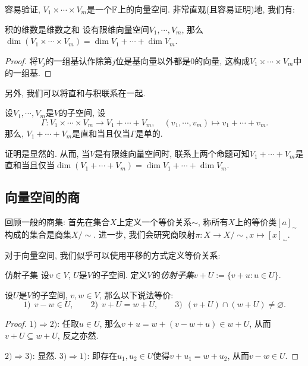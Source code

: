 容易验证, $V_1 \times \cdots \times V_m$是一个$\mathbb{F}$上的向量空间. 非常直观(且容易证明)地, 我们有: 

\begin{proposition}{积的维数是维数之和}
	设有限维向量空间$V_1,\cdots, V_m$, 那么$\dim (V_1 \times \cdots \times V_m) = \dim V_1 + \cdots + \dim V_m$. 
\end{proposition}
\begin{proof}
	将$V_j$的一组基认作除第$j$位是基向量以外都是$0$的向量, 这构成$V_1 \times \cdots \times V_m$中的一组基. 
\end{proof}

另外, 我们可以将直和与积联系在一起. 

\begin{proposition}{}
	设$V_1,\cdots ,V_m$是$V$的子空间, 设$$\Gamma :V_1\times \cdots \times V_m \to V_1+\cdots +V_m,\quad (v_1,\cdots ,v_m)\mapsto v_1+\cdots +v_m. $$
	那么, $V_1 + \cdots + V_m$是直和当且仅当$\Gamma$是单的. 
\end{proposition}

证明是显然的. 从而, 当$V$是有限维向量空间时, 联系上两个命题可知$V_1+\cdots +V_m$是直和当且仅当$\dim (V_1 + \cdots + V_m) = \dim V_1 + \cdots + \dim V_m$. 

\subsection{向量空间的商}

回顾一般的商集: 首先在集合$X$上定义一个等价关系$\sim$, 称所有$X$上的等价类$[a]_{\sim}$构成的集合是商集$X/\sim$. 进一步, 我们会研究商映射$\pi :X \to X/\sim ,x \mapsto [x]_{\sim}$. 

对于向量空间, 我们似乎可以使用平移的方式定义等价关系: 

\begin{definition}{仿射子集}
	设$v \in V$, $U$是$V$的子空间. 定义$V$的\textit{仿射子集}$v+U := \{ v+u:u \in U \}$. 
\end{definition}

\begin{proposition}{}
	设$U$是$V$的子空间, $v,w \in V$, 那么以下说法等价: 
	$$1)~~ v-w \in U,\qquad 2)~~ v+U=w+U,\qquad 3)~~ (v+U) \cap (w+U) \neq \varnothing.$$
\end{proposition}
\begin{proof}
	$1) \Rightarrow 2)$: 任取$u \in U$, 那么$v+u = w+(v-w+u) \in w+U$, 从而$v+U \subseteq w+U$, 反之亦然. 
	
	$2) \Rightarrow 3)$: 显然. $3) \Rightarrow 1)$: 即存在$u_1,u_2 \in U$使得$v+u_1=w+u_2$, 从而$v-w \in U$. 
\end{proof}

